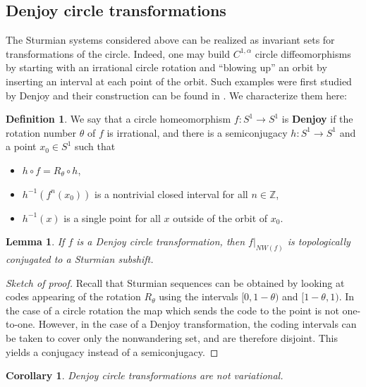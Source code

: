 \documentclass[oneside]{amsart}
\theoremstyle{plain}
\newtheorem{LEM}[THM]{Lemma}
\newtheorem{COR}[THM]{Corollary}
\theoremstyle{definition}
\newtheorem{DEF}[THM]{Definition}
\newcommand{\<}{\langle}
\renewcommand{\>}{\rangle}
\newcommand{\Z}{\mathbb{Z}}
\newcommand{\of}{\circ}
\renewcommand{\|}{|\!|} %
\begin{document}
\subsection{Denjoy circle transformations}
\label{sec:denjoy}
The Sturmian systems considered above can be realized as invariant sets for transformations of the circle. Indeed, one may build $C^{1,\alpha}$ circle diffeomorphisms by starting with an irrational circle rotation and ``blowing up'' an orbit by inserting an interval at each point of the orbit. Such examples were first studied by Denjoy and their construction can be found in \cite[Section 12.2]{hasselblatt-katok}. We characterize them here:

\begin{DEF}
    We say that a circle homeomorphism $f : S^1 \to S^1$ is {\bf Denjoy} if the rotation number $\theta$ of $f$ is irrational, and there is a semiconjugacy $h : S^1 \to S^1$ and a point $x_0 \in S^1$ such that
    
    \begin{itemize}
        \item $h \of f = R_\theta \of h$,
        \item $h^{-1}(f^n(x_0))$ is a nontrivial closed interval for all $n \in \Z$,
        \item $h^{-1}(x)$ is a single point for all $x$ outside of the orbit of $x_0$.
    \end{itemize} 
\end{DEF}

\begin{LEM}
    If $f$ is a Denjoy circle transformation, then $f|_{NW(f)}$ is topologically conjugated to a Sturmian subshift.
\end{LEM}

\begin{proof}[Sketch of proof]
    Recall that Sturmian sequences can be obtained by looking at codes appearing of the rotation $R_\theta$ using the intervals $[0,1-\theta)$ and $[1-\theta,1)$. In the case of a circle rotation the map which sends the code to the point is not one-to-one. However, in the case of a Denjoy transformation, the coding intervals can be taken to cover only the nonwandering set, and are therefore disjoint. This yields a conjugacy instead of a semiconjugacy.
\end{proof}

\begin{COR}
    Denjoy circle transformations are not variational.
\end{COR}
\end{document}
